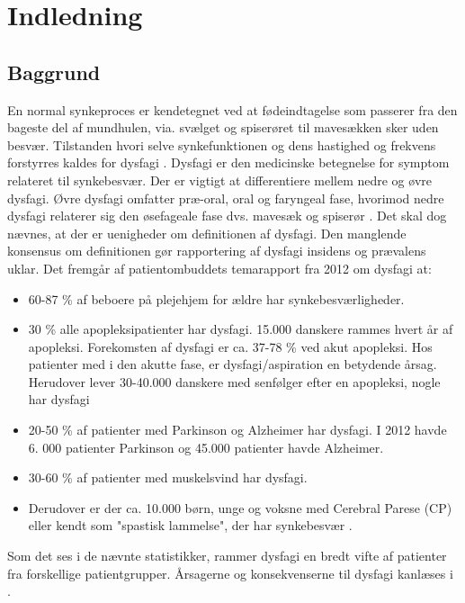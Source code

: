 \chapter{Indledning}

\section{Baggrund}
En normal synkeproces er kendetegnet ved at fødeindtagelse som passerer fra den bageste del af mundhulen, via. svælget og spiserøret til mavesækken sker uden besvær. Tilstanden hvori selve synkefunktionen og dens hastighed og frekvens forstyrres kaldes for dysfagi \cite{Sundhedsstyrelsen2015NationalDysfagi}. Dysfagi er den medicinske betegnelse for symptom relateret til synkebesvær. Der er vigtigt at differentiere mellem nedre og øvre dysfagi. Øvre dysfagi omfatter præ-oral, oral og faryngeal fase, hvorimod nedre dysfagi relaterer sig den øsefageale fase dvs. mavesæk og spiserør \cite{KjaersgaardPh.d.studerendeDYSFAGIKonsekvenser}. Det skal dog nævnes, at der er uenigheder om definitionen af dysfagi. Den manglende konsensus om definitionen gør rapportering af dysfagi insidens og prævalens uklar. Det fremgår af patientombuddets temarapport fra 2012 om dysfagi at:

\begin{itemize}
\item 60-87 \% af beboere på plejehjem for ældre har synkebesværligheder.
\item 30 \% alle apopleksipatienter har dysfagi. 15.000 danskere rammes hvert år af apopleksi. Forekomsten af dysfagi er ca. 37-78 \% ved akut apopleksi. Hos patienter med i den akutte fase, er dysfagi/aspiration en betydende årsag. Herudover lever 30-40.000 danskere med senfølger efter en apopleksi, nogle har dysfagi
\item 20-50 \% af patienter med Parkinson og Alzheimer har dysfagi. I 2012 havde 6. 000 patienter Parkinson og 45.000 patienter havde Alzheimer.  
\item 30-60 \% af patienter med muskelsvind har dysfagi.
\item Derudover er der ca. 10.000 børn, unge og voksne med Cerebral Parese (CP) eller kendt som "spastisk lammelse", der har synkebesvær \cite{Bommersholdt2012TemarapportDysfagi}. 
\end{itemize}

Som det ses i de nævnte statistikker, rammer dysfagi en bredt vifte af patienter fra forskellige patientgrupper. Årsagerne og konsekvenserne til dysfagi kanlæses i . 

